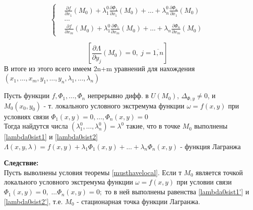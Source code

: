 \begin{equation}\label{lambda0sist1}
	\left\{ \begin{array}{rcl}
		&\frac{\partial f}{\partial x_1}(M_0) + \lambda_1^0  \frac{\partial \Phi_1}{\partial x_1}(M_0)+ \dots + \lambda_n^0  \frac{\partial \Phi_n}{\partial x_1}(M_0)
		\\ &\dots \\
		&\frac{\partial f}{\partial x_m}(M_0) + \lambda_1^0  \frac{\partial \Phi_1}{\partial x_m}(M_0)+ \dots + \lambda_n  \frac{\partial \Phi_n}{\partial x_m}(M_0)
	\end{array}\right.
\end{equation}

\begin{equation}\label{lambda0sist1'}
\left[ \frac{\partial \Lambda}{\partial y_j}(M_0) = 0, \; j=\overline{1,n}    \right]
\end{equation}
В итоге из этого всего имеем 2n+m уравнений для нахождения $(x_1, \dots, x_m, y_1, \dots, y_n, \lambda_1, \dots,  \lambda_n)$
\\
\begin{theorem}\label{musthavelocal}
	Пусть функции $f, \Phi_1, \dots, \Phi_n$ непрерывно дифф. в $U(M_0)$, $\Delta_{\Phi, y}\ne0$, и $M_0(x_0, y_0)$ - т. локального условного экстремума функции $\omega=f(x,y)$ при условиях связи $\Phi_1(x,y)=0, \dots, \Phi_n(x,y)=0 $\\ 
	Тогда найдутся числа $(\lambda_1^0, \dots, \lambda_n^0)=\lambda^0$ такие, что в точке $M_0$ выполнены \ref{lambda0sist1} и \ref{lambda0sist2}\\
	$\Lambda(x,y,\lambda)=f(x,y)+\lambda_1\Phi_1(x,y)+\dots + \lambda_n\Phi_n(x,y)$ - функция Лагранжа
\end{theorem}
\textbf{Следствие:}\\
Пусть выволнены условия теоремы \ref{musthavelocal}. Если т $M_0$ является точкой локального условного экстремума функции $\omega=f(x, y)$ при условии связи $\Phi_1(x,y)=0, \; \dots \Phi_n(x,y)=0;$ то в ней выполнены равенства \ref{lambda0sist1'} и \ref{lambda0sist2'}, т.е. $M_0$ - стационарная точка функции Лагранжа.

